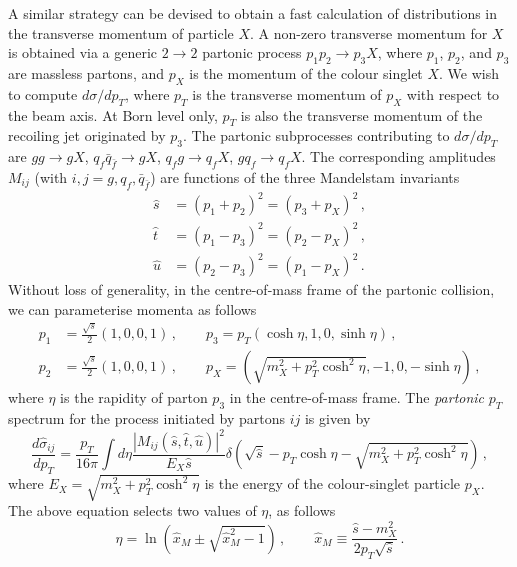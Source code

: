 \documentclass[12pt]{article}
\begin{document}
A similar strategy can be devised to obtain a fast calculation of
distributions in the transverse momentum of particle $X$. A non-zero
transverse momentum for $X$ is obtained via a generic $2\to 2$
partonic process $p_1 p_2 \to p_3 X$, where $p_1$, $p_2$, and $p_3$ are massless
partons, and $p_X$ is the momentum of the colour singlet $X$. We
wish to compute $d\sigma/dp_T$, where $p_T$ is the transverse momentum
of $p_X$ with respect to the beam axis. At Born level only, $p_T$ is
also the transverse momentum of the recoiling jet originated by
$p_3$. The partonic subprocesses contributing to $d\sigma/dp_T$ are
$gg\to g X$, $q_f \bar q_{\bar f} \to g X$, $q_f g\to q_f X$,
$gq_f \to q_fX$. The corresponding amplitudes $M_{ij}$ (with
$i,j=g,q_f,\bar q_{\bar f}$) are functions of the three Mandelstam
invariants
\begin{equation}
  \label{eq:Mandelstam}
  \begin{split}
  \hat s & = (p_1+p_2)^2 = (p_3+p_X)^2 \,,\\
  \hat t & = (p_1-p_3)^2 = (p_2-p_X)^2 \,,\\
  \hat u & = (p_2-p_3)^2 = (p_1-p_X)^2 \,.
  \end{split}
\end{equation}
Without loss of generality, in the centre-of-mass frame of the
partonic collision, we can parameterise momenta as follows
\begin{equation}
  \label{eq:momenta}
  \begin{split}
  p_1&=\frac{\sqrt s}{2}(1,0,0,1)\,,\qquad p_3 = p_T(\cosh\eta,1,0,\sinh\eta)\,,\\
  p_2&=\frac{\sqrt s}{2}(1,0,0,1)\,,\qquad p_X = \left ( \sqrt{m_X^2+p^2_T\cosh^2\eta},-1,0,-\sinh\eta \right ) \,,
  \end{split}
\end{equation}
where $\eta$ is the rapidity of parton $p_3$ in the
centre-of-mass frame. The {\em partonic} $p_T$ spectrum for the
process initiated by partons $ij$ is given by
\begin{equation}
  \label{eq:partonic-pt}
  \frac{d\hat \sigma_{ij}}{dp_T} = \frac{p_T}{16\pi}\int d\eta \frac{|M_{ij}(\hat s,\hat t,\hat u)|^2}{E_X \hat s} \delta\left(\sqrt{\hat s} - p_T\cosh\eta-\sqrt{m_X^2+p^2_T\cosh^2\eta}\right)\,, 
\end{equation}
where $E_X=\sqrt{m_X^2+p^2_T\cosh^2\eta}$ is the energy of the colour-singlet
particle $p_X$.  The above equation selects two values of $\eta$, as
follows
\begin{equation}
\label{eq:eta-values}
  \eta = \ln\left(\hat x_M \pm \sqrt{\hat x_M^2-1}\right)\,,\qquad \hat x_M\equiv\frac{\hat s-m_X^2}{2 p_T \sqrt{\hat s} }\,.
\end{equation}
\end{document}
